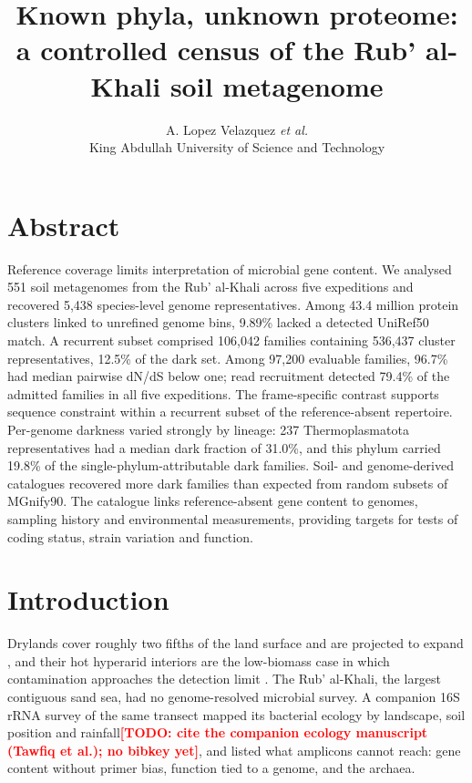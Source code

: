 \documentclass[11pt]{article}
\title{\textbf{Known phyla, unknown proteome:\\ a controlled census of the Rub' al-Khali soil metagenome}}
\author{A. Lopez Velazquez \textit{et al.}\\ \small King Abdullah University of Science and Technology}
\date{}
\providecommand{\todo}[1]{\textcolor{red}{\textbf{[TODO: #1]}}}
\begin{document}
\maketitle

\section*{Abstract}
Reference coverage limits interpretation of microbial gene content. We analysed 551 soil
metagenomes from the Rub' al-Khali across five expeditions and recovered 5{,}438 species-level
genome representatives. Among 43.4 million protein clusters linked to unrefined genome bins,
9.89\% lacked a detected UniRef50 match. A recurrent subset comprised 106{,}042 families containing
536{,}437 cluster representatives, 12.5\% of the dark set. Among 97{,}200 evaluable families,
96.7\% had median pairwise dN/dS below one; read recruitment detected 79.4\% of the admitted
families in all five expeditions. The frame-specific contrast supports sequence constraint within a recurrent
subset of the reference-absent repertoire. Per-genome darkness varied strongly by lineage:
237 Thermoplasmatota representatives had a median dark fraction of 31.0\%, and this phylum
carried 19.8\% of the single-phylum-attributable dark families. Soil- and genome-derived
catalogues recovered more dark families than expected from random subsets of MGnify90.
The catalogue links reference-absent gene content to genomes, sampling history and environmental
measurements, providing targets for tests of coding status, strain variation and function.

\section*{Introduction}

Drylands cover roughly two fifths of the land surface and are projected to expand
\citep{huang2016dryland,maestre2015aridity}, and their hot hyperarid interiors are the low-biomass
case in which contamination approaches the detection limit \citep{contamination2025guidelines}. The
Rub' al-Khali, the largest contiguous sand sea, had no genome-resolved microbial survey. A companion
16S rRNA survey of the same transect mapped its bacterial ecology by landscape, soil position and
rainfall\todo{cite the companion ecology manuscript (Tawfiq et al.); no bibkey yet}, and listed what
amplicons cannot reach: gene content without primer bias, function tied to a genome, and the archaea.
\end{document}
